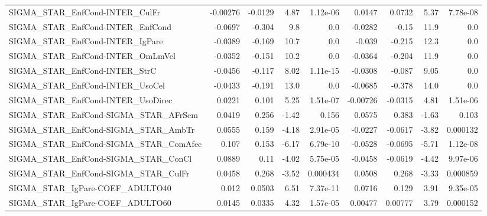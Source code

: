 \begin{tabular}{lrrrrrrrr}
SIGMA\_STAR\_EnfCond-INTER\_CulFr         &    -0.00276 &      -0.0129 &    4.87 & 1.12e-06 &     0.0147 &      0.0732 &         5.37 &      7.78e-08 \\
SIGMA\_STAR\_EnfCond-INTER\_EnfCond       &     -0.0697 &       -0.304 &     9.8 &      0.0 &    -0.0282 &       -0.15 &         11.9 &           0.0 \\
SIGMA\_STAR\_EnfCond-INTER\_IgPare        &     -0.0389 &       -0.169 &    10.7 &      0.0 &     -0.039 &      -0.215 &         12.3 &           0.0 \\
SIGMA\_STAR\_EnfCond-INTER\_OmLmVel       &     -0.0352 &       -0.151 &    10.2 &      0.0 &    -0.0364 &      -0.204 &         11.9 &           0.0 \\
SIGMA\_STAR\_EnfCond-INTER\_StrC          &     -0.0456 &       -0.117 &    8.02 & 1.11e-15 &    -0.0308 &      -0.087 &         9.05 &           0.0 \\
SIGMA\_STAR\_EnfCond-INTER\_UsoCel        &     -0.0433 &       -0.191 &    13.0 &      0.0 &    -0.0685 &      -0.378 &         14.0 &           0.0 \\
SIGMA\_STAR\_EnfCond-INTER\_UsoDirec      &      0.0221 &        0.101 &    5.25 & 1.51e-07 &   -0.00726 &     -0.0315 &         4.81 &      1.51e-06 \\
SIGMA\_STAR\_EnfCond-SIGMA\_STAR\_AFrSem   &      0.0419 &        0.256 &   -1.42 &    0.156 &     0.0575 &       0.383 &        -1.63 &         0.103 \\
SIGMA\_STAR\_EnfCond-SIGMA\_STAR\_AmbTr    &      0.0555 &        0.159 &   -4.18 & 2.91e-05 &    -0.0227 &     -0.0617 &        -3.82 &      0.000132 \\
SIGMA\_STAR\_EnfCond-SIGMA\_STAR\_ComAfec  &       0.107 &        0.153 &   -6.17 & 6.79e-10 &    -0.0528 &     -0.0695 &        -5.71 &      1.12e-08 \\
SIGMA\_STAR\_EnfCond-SIGMA\_STAR\_ConCl    &      0.0889 &         0.11 &   -4.02 & 5.75e-05 &    -0.0458 &     -0.0619 &        -4.42 &      9.97e-06 \\
SIGMA\_STAR\_EnfCond-SIGMA\_STAR\_CulFr    &      0.0458 &        0.268 &   -3.52 & 0.000434 &     0.0508 &       0.268 &        -3.33 &      0.000859 \\
SIGMA\_STAR\_IgPare-COEF\_ADULTO40        &       0.012 &       0.0503 &    6.51 & 7.37e-11 &     0.0716 &       0.129 &         3.91 &      9.35e-05 \\
SIGMA\_STAR\_IgPare-COEF\_ADULTO60        &      0.0145 &       0.0335 &    4.32 & 1.57e-05 &    0.00477 &     0.00777 &         3.79 &      0.000152 \\

\end{tabular}

